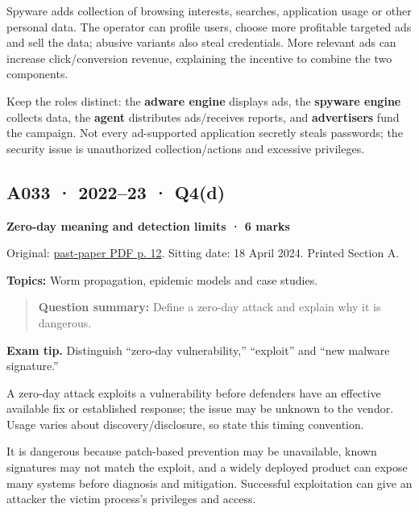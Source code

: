 \documentclass[11pt,a4paper]{article}
\begin{document}
Spyware adds collection of browsing interests,\allowbreak{} searches,\allowbreak{} application usage or other personal data. The operator can profile users,\allowbreak{} choose more profitable targeted ads and sell the data; abusive variants also steal credentials. More relevant ads can increase click/\allowbreak{}conversion revenue,\allowbreak{} explaining the incentive to combine the two components.


Keep the roles distinct: the \textbf{adware engine} displays ads,\allowbreak{} the \textbf{spyware engine} collects data,\allowbreak{} the \textbf{agent} distributes ads/\allowbreak{}receives reports,\allowbreak{} and \textbf{advertisers} fund the campaign. Not every ad-supported application secretly steals passwords; the security issue is unauthorized collection/\allowbreak{}actions and excessive privileges.




\clearpage
\subsection{A033 · 2022–23 · Q4(d)}\label{a033}

\textbf{Zero-day meaning and detection limits · 6 marks}


Original: \href{../../CSE405-Security_Merged.pdf\#page=12}{past-paper PDF p. 12}. Sitting date: 18 April 2024. Printed Section A.


\textbf{Topics:} Worm propagation,\allowbreak{} epidemic models and case studies.



\begin{quote}\small

\textbf{Question summary:} Define a zero-day attack and explain why it is dangerous.



\end{quote}


{\color{ForestGreen}\textbf{Exam tip.} Distinguish “zero-day vulnerability,\allowbreak{}” “exploit” and “new malware signature.”}


A zero-day attack exploits a vulnerability before defenders have an effective available fix or established response; the issue may be unknown to the vendor. Usage varies about discovery/\allowbreak{}disclosure,\allowbreak{} so state this timing convention.


It is dangerous because patch-based prevention may be unavailable,\allowbreak{} known signatures may not match the exploit,\allowbreak{} and a widely deployed product can expose many systems before diagnosis and mitigation. Successful exploitation can give an attacker the victim process's privileges and access.
\end{document}
